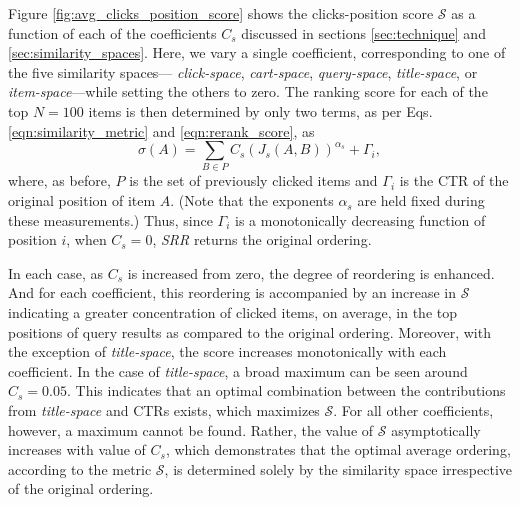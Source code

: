 \documentclass{article}
\begin{document}
Figure \ref{fig:avg_clicks_position_score} shows the clicks-position score
$\mathscr{S}$ as a function of each of the coefficients $C_s$ discussed in
sections \ref{sec:technique} and \ref{sec:similarity_spaces}. Here, we vary a
single coefficient, corresponding to one of the five similarity spaces---{\em
click-space}, {\em cart-space}, {\em query-space}, {\em title-space}, or {\em
item-space}---while setting the others to zero. The ranking score for each of
the top $N=100$ items is then determined by only two terms, as per Eqs.
\ref{eqn:similarity_metric} and \ref{eqn:rerank_score}, as
\begin{equation*}\label{eqn:single_coeff_score} 
    \sigma(A) = \sum_{B \in P}{C_s(J_s(A,B))^{\alpha_s}} + \Gamma_i, 
\end{equation*}
where, as before, $P$ is the set of previously clicked items and $\Gamma_i$ is
the CTR of the original position of item $A$. (Note that the exponents
$\alpha_s$ are held fixed during these measurements.) Thus, since $\Gamma_i$ is
a monotonically decreasing function of position $i$, when $C_s = 0$, {\em SRR}
returns the original ordering.

In each case, as $C_s$ is increased from zero, the degree of reordering is
enhanced.  And for each coefficient, this reordering is accompanied by an
increase in $\mathscr{S}$ indicating a greater concentration of clicked items,
on average, in the top positions of query results as compared to the original
ordering.  Moreover, with the exception of {\em title-space}, the score
increases monotonically with each coefficient. In the case of {\em
title-space}, a broad maximum can be seen around $C_s = 0.05$. This indicates
that an optimal combination between the contributions from {\em title-space}
and CTRs exists, which maximizes $\mathscr{S}$. For all other coefficients,
however, a maximum cannot be found. Rather, the value of $\mathscr{S}$
asymptotically increases with value of $C_s$, which demonstrates that the
optimal average ordering, according to the metric $\mathscr{S}$, is determined
solely by the similarity space irrespective of the original ordering.
\end{document}

